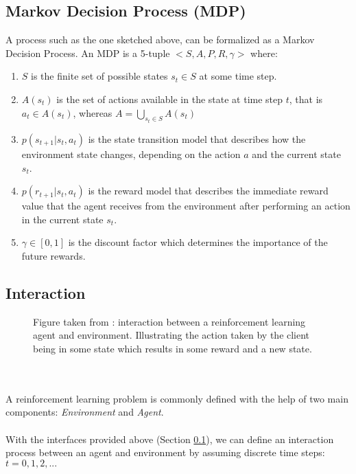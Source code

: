 \subsection{Markov Decision Process (MDP)}
\label{rl-mdp}

A process such as the one sketched above, can be formalized as a Markov Decision Process.
An MDP is a 5-tuple $<S, A, P, R, \gamma >$ where:
\begin{enumerate}
    \item $S$ is the finite set of possible states $s_t \in S$ at some time step.
    \item $A(s_t)$ is the set of actions available in the state at time step $t$, that is $a_t \in A(s_t)$, whereas $A=\bigcup_{s_t \in S} A(s_t)$
    \item $p(s_{t+1} | s_t, a_t)$ is the state transition model that describes how the environment state changes, depending on the action $a$ and the current state $s_t$.
    \item $p(r_{t+1} | s_t, a_t)$ is the reward model that describes the immediate reward value that the agent receives from the environment after performing an action in the current state $s_t$.
    \item $\gamma \in [0,1]$ is the discount factor which determines the importance of the future rewards.
\end{enumerate}

\subsection{Interaction}

\begin{figure}[H]
    \centering
    \caption{Figure taken from \cite{rl-demystified}: interaction between a reinforcement learning agent and environment. Illustrating the action taken by the client being in some state which results in some reward and a new state.}
    \label{fit:rl-overview}
\end{figure}
\\
\\
A reinforcement learning problem is commonly defined with the help of two main components: \textit{Environment} and \textit{Agent}.
\\
\\
With the interfaces provided above (Section \ref{rl-mdp}), we can define an interaction process between an agent and environment by assuming discrete time steps: $t=0, 1, 2, ...$

